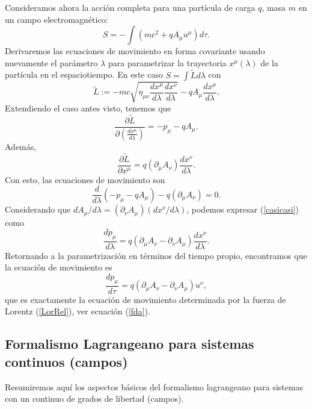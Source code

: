 Consideramos ahora la acción completa para una partícula de carga $q$, masa
$m$ en un campo electromagnético:
\begin{equation}
\boxed{S=-\int \left(mc^2+ qA_\mu u^\mu \right) d\tau.}
\end{equation}
Derivaremos las ecuaciones de movimiento en forma covariante usando nuevamente
el parámetro $\lambda$ para parametrizar la trayectoria $x^\mu(\lambda)$ de la
partícula en el espaciotiempo. En este caso $S=\int \tilde{L}d\lambda$ con
\begin{equation}
\tilde{L}:=-mc\sqrt{\eta_{\mu\nu}\frac{dx^\mu}{d\lambda}\frac{dx^\nu}{d\lambda}}-qA_\mu \frac{dx^\mu}{d\lambda}. \label{Ltilde2}
\end{equation}
Extendiendo el caso antes visto, tenemos que
\begin{equation}
 \frac{\partial\tilde{L}}{\partial\left(\frac{dx^\mu}{d\lambda}\right)}=-p_\mu-qA_\mu.
\end{equation}
Además,
\begin{equation}
\frac{\partial \tilde{L}}{\partial x^\mu}=q\left( \partial_\mu
A_\nu\right)  \frac{dx^\nu}{d\lambda}.
\end{equation}
Con esto, las ecuaciones de movimiento son
\begin{equation}
\frac{d}{d\lambda}\left( -p_\mu -qA_\mu\right) -q\left(
\partial_\mu A_\nu\right)=0. \label{casicasi}
\end{equation}
Considerando que ${dA_\mu}/{d\lambda}=\left( \partial_\nu A_\mu \right)
({dx^\nu}/{d\lambda})$, podemos expresar (\ref{casicasi}) como
\begin{equation}
\frac{dp_\mu}{d\lambda} =q\left( \partial_\mu A_\nu-\partial_\nu
A_\mu\right)\frac{dx^\nu}{d\lambda}.
\end{equation}
Retornando a la parametrización en términos del tiempo propio, encontramos que
la ecuación de movimiento es
\begin{equation}
\frac{dp_\mu}{d\tau} =q\left( \partial_\mu A_\nu-\partial_\nu
A_\mu\right)u^\nu,
\end{equation}
que es exactamente la ecuación de movimiento determinada por la fuerza de
Lorentz (\ref{LorRel}), ver ecuación (\ref{fda}).


\subsection{Formalismo Lagrangeano para sistemas continuos (campos)}
Resumiremos aquí los aspectos básicos del formalismo lagrangeano para sistemas
con un continuo de grados de libertad (campos).

